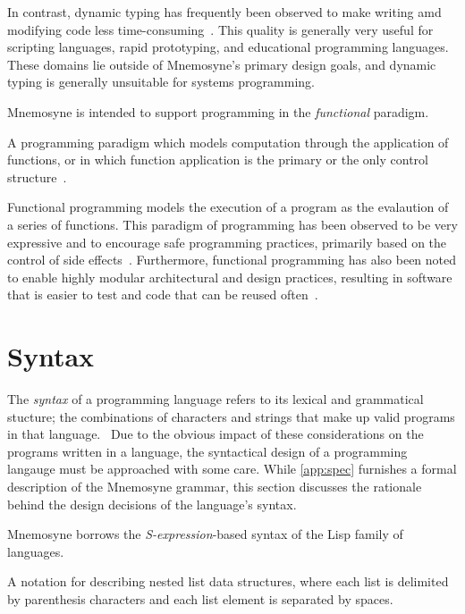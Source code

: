 In contrast, dynamic typing has frequently been observed to make writing amd modifying code less time-consuming~\cite{Mayer:2012:ESI:2398857.2384666,}. This quality is generally very useful for scripting languages, rapid prototyping, and educational programming languages. These domains lie outside of Mnemosyne's primary design goals, and dynamic typing is generally unsuitable for systems programming.

Mnemosyne is intended to support programming in the \textit{functional} paradigm.

\begin{defn}
A programming paradigm which models computation through the application of functions, or in which function application is the primary or the only control structure~\cite{Wise:2003:FP:1074100.1074416,hughes1989functional}.
\end{defn}

Functional programming models the execution of a program as the evalaution of a series of functions. This paradigm of programming has been observed to be very expressive and to encourage safe programming practices, primarily based on the control of side effects~\cite{hughes1989functional,hudak1994haskell}. Furthermore, functional programming has also been noted to enable highly modular architectural and design practices, resulting in software that is easier to test and code that can be reused often~\cite{hughes1989functional,hudak1994haskell}.

\section{Syntax}\label{sec:syntax}

The \textit{syntax} of a programming language refers to its lexical and grammatical stucture; the combinations of characters and strings that make up valid programs in that language.~\cite{Hemmendinger:2003:SSP:1074100.1074848} Due to the obvious impact of these considerations on the programs written in a language, the syntactical design of a programming langauge must be approached with some care. While \cref{app:spec} furnishes a formal description of the Mnemosyne grammar, this section discusses the rationale behind the design decisions of the language's syntax.

Mnemosyne borrows the \textit{S-expression}-based syntax of the Lisp family of languages.

\begin{defn}[S-expression]
A notation for describing nested list data structures, where each list is delimited by parenthesis characters and each list element is separated by spaces.
\end{defn}

